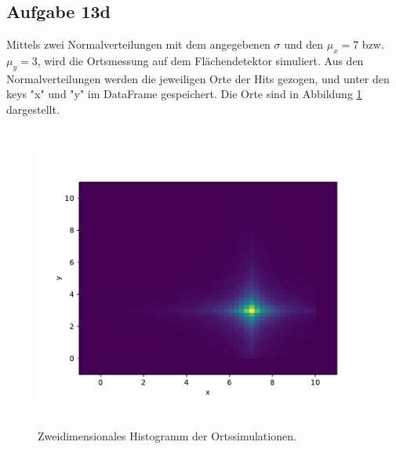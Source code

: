     \subsection{Aufgabe 13d}
    Mittels zwei Normalverteilungen mit dem angegebenen $\sigma$ und den $\mu_x = 7$ bzw.
    $\mu_y=3$, wird die Ortsmessung auf dem Flächendetektor simuliert. Aus den Normalverteilungen werden
    die jeweiligen Orte der Hits gezogen, und unter den keys "x" und "y" im DataFrame gespeichert.
    Die Orte sind in Abbildung \ref{fig:detektor} dargestellt.
    \begin{figure}[H]
      \centering
      \includegraphics[height=10cm]{detektor.pdf}
      \caption{Zweidimensionales Histogramm der Ortssimulationen.}
      \label{fig:detektor}
    \end{figure}

